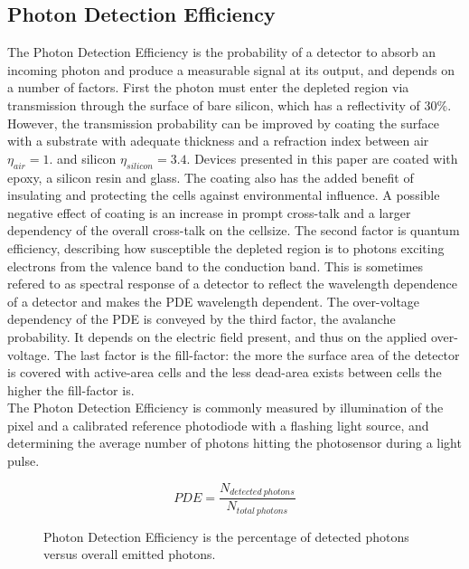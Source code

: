 \documentclass[12pt,article,type=msc,colorback,accentcolor=tud9c]{tudthesis}
\begin{document}
\subsection{Photon Detection Efficiency}
The Photon Detection Efficiency is the probability of a detector to absorb an incoming photon and produce a measurable signal at its output, and depends on a number of factors. First the photon must enter the depleted region via transmission through the surface of bare silicon, which has a reflectivity of 30$\%$. However, the transmission probability can be improved by coating the surface with a substrate with adequate thickness and a refraction index between air $\eta_{air} = 1.$ and silicon $\eta_{silicon} = 3.4$. Devices presented in this paper are coated with epoxy, a silicon resin and glass. The coating also has the added benefit of insulating and protecting the cells against environmental influence. A possible negative effect of coating is an increase in prompt cross-talk and a larger dependency of the overall cross-talk on the cellsize. The second factor is quantum efficiency, describing how susceptible the depleted region is to photons exciting electrons from the valence band to the conduction band. This is sometimes refered to as spectral response of a detector to reflect the wavelength dependence of a detector and makes the PDE wavelength dependent. The over-voltage dependency of the PDE is conveyed by the third factor, the avalanche probability. It depends on the electric field present, and thus on the applied over-voltage. The last factor is the fill-factor: the more the surface area of the detector is covered with active-area cells and the less dead-area exists between cells the higher the fill-factor is. \\
The Photon Detection Efficiency is commonly measured by illumination of the pixel and a calibrated reference photodiode with a flashing light source, and determining the average number of photons hitting the photosensor during a light pulse.

\begin{figure}[h]
\begin{equation}
PDE = \frac{N_{detected\:photons}}{N_{total\:photons}}
\end{equation}
\label{PDE_eq}
\caption{Photon Detection Efficiency is the percentage of detected photons versus overall emitted photons. }
\end{figure}



\clearpage
\end{document}
